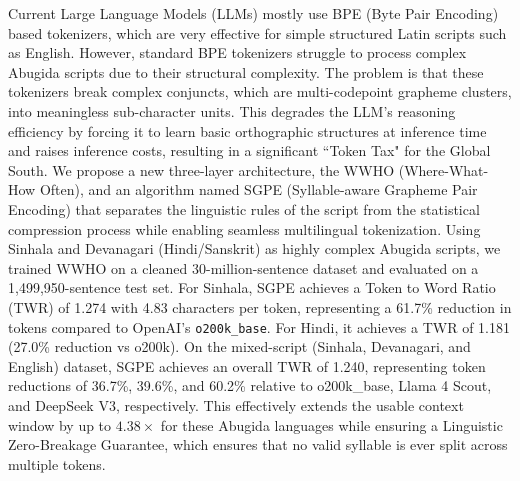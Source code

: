 Current Large Language Models (LLMs) mostly use BPE (Byte Pair Encoding) based tokenizers, which are very effective for simple structured Latin scripts such as English. However, standard BPE tokenizers struggle to process complex Abugida scripts due to their structural complexity. The problem is that these tokenizers break complex conjuncts, which are multi-codepoint grapheme clusters, into meaningless sub-character units. This degrades the LLM's reasoning efficiency by forcing it to learn basic orthographic structures at inference time and raises inference costs, resulting in a significant ``Token Tax" for the Global South. We propose a new three-layer architecture, the WWHO (Where-What-How Often), and an algorithm named SGPE (Syllable-aware Grapheme Pair Encoding) that separates the linguistic rules of the script from the statistical compression process while enabling seamless multilingual tokenization. 
Using Sinhala and Devanagari (Hindi/Sanskrit) as highly complex Abugida scripts, we trained WWHO on a cleaned 30-million-sentence dataset and evaluated on a 1,499,950-sentence test set. For Sinhala, SGPE achieves a Token to Word Ratio (TWR) of 1.274 with 4.83 characters per token, representing a 61.7\% reduction in tokens compared to OpenAI’s \texttt{o200k\_base}. For Hindi, it achieves a TWR of 1.181 (27.0\% reduction vs o200k). On the mixed-script (Sinhala, Devanagari, and English) dataset, SGPE achieves an overall TWR of 1.240, representing token reductions of 36.7\%, 39.6\%, and 60.2\% relative to o200k\_base, Llama 4 Scout, and DeepSeek V3, respectively. This effectively extends the usable context window by up to $4.38\times$ for these Abugida languages while ensuring a Linguistic Zero-Breakage Guarantee, which ensures that no valid syllable is ever split across multiple tokens.

